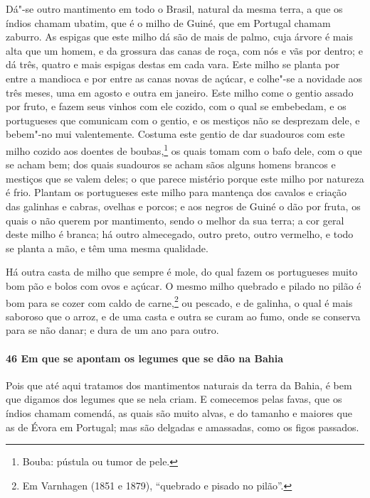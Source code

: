 Dá"-se outro mantimento em todo o Brasil, natural da mesma terra, a que os índios chamam
ubatim, que é o milho de Guiné, que em Portugal chamam zaburro. As espigas que este milho
dá são de mais de palmo, cuja árvore é mais alta que um homem, e da grossura das canas de
roça, com nós e vãs por dentro; e dá três, quatro e mais espigas destas em cada vara. Este
milho se planta por entre a mandioca e por entre as canas novas de açúcar, e colhe"-se a
novidade aos três meses, uma em agosto e outra em janeiro. Este milho come o gentio assado
por fruto, e fazem seus vinhos com ele cozido, com o qual se embebedam, e os portugueses
que comunicam com o gentio, e os mestiços não se desprezam dele, e bebem"-no mui
valentemente. Costuma este gentio de dar suadouros com este milho cozido aos doentes de
boubas,\footnote{ Bouba: pústula ou tumor de
pele.} os quais tomam com o bafo dele, com o que se acham bem;
dos quais suadouros se acham sãos alguns homens brancos e mestiços que se valem deles; o
que parece mistério porque este milho por natureza é frio. Plantam os portugueses este
milho para mantença dos cavalos e criação das galinhas e cabras, ovelhas e porcos; e aos
negros de Guiné o dão por fruta, os quais o não querem por mantimento, sendo o melhor da
sua terra; a cor geral deste milho é branca; há outro almecegado, outro preto, outro
vermelho, e todo se planta a mão, e têm uma mesma qualidade.

Há outra casta de milho que sempre é mole, do qual fazem os portugueses muito bom pão e
bolos com ovos e açúcar. O mesmo milho quebrado e pilado no pilão é bom para se cozer com
caldo de carne,\footnote{ Em Varnhagen (1851 e 1879), ``quebrado e pisado no pilão''.} ou
pescado, e de galinha, o qual é mais saboroso que o arroz, e de uma casta e outra se curam
ao fumo, onde se conserva para se não danar; e dura de um ano para outro.

\paragraph{46 Em que se apontam os legumes que se dão na Bahia}

Pois que até aqui tratamos dos mantimentos naturais da terra da Bahia, é bem que digamos
dos legumes que se nela criam. E comecemos pelas favas, que os índios chamam comendá, as
quais são muito alvas, e do tamanho e maiores que as de Évora em Portugal; mas são
delgadas e amassadas, como os figos passados.

